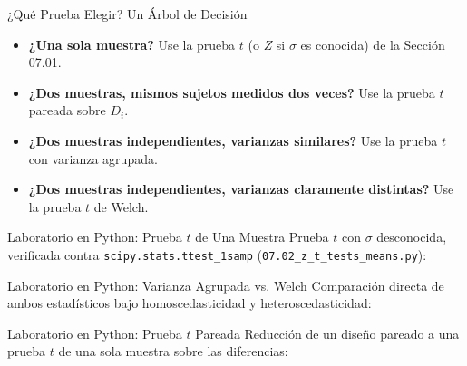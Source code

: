 \documentclass[10pt, aspectratio=169]{beamer}
\begin{document}
\begin{frame}{¿Qué Prueba Elegir? Un Árbol de Decisión}
  \footnotesize
  \begin{itemize}\itemsep=0.12cm
    \item \textbf{¿Una sola muestra?} Use la prueba $t$ (o $Z$ si $\sigma$ es conocida) de la Sección 07.01. \pause
    \item \textbf{¿Dos muestras, mismos sujetos medidos dos veces?} Use la prueba $t$ pareada sobre $D_i$. \pause
    \item \textbf{¿Dos muestras independientes, varianzas similares?} Use la prueba $t$ con varianza agrupada. \pause
    \item \textbf{¿Dos muestras independientes, varianzas claramente distintas?} Use la prueba $t$ de Welch.
  \end{itemize}
\end{frame}

\begin{frame}[fragile]{Laboratorio en Python: Prueba $t$ de Una Muestra}
  \scriptsize
  Prueba $t$ con $\sigma$ desconocida, verificada contra \texttt{scipy.stats.ttest\_1samp} (\texttt{07.02\_z\_t\_tests\_means.py}):
  {
  }
\end{frame}

\begin{frame}[fragile]{Laboratorio en Python: Varianza Agrupada vs. Welch}
  \scriptsize
  Comparación directa de ambos estadísticos bajo homoscedasticidad y heteroscedasticidad:
  {
  }
\end{frame}

\begin{frame}[fragile]{Laboratorio en Python: Prueba $t$ Pareada}
  \scriptsize
  Reducción de un diseño pareado a una prueba $t$ de una sola muestra sobre las diferencias:
  {
  }
\end{frame}
\end{document}
